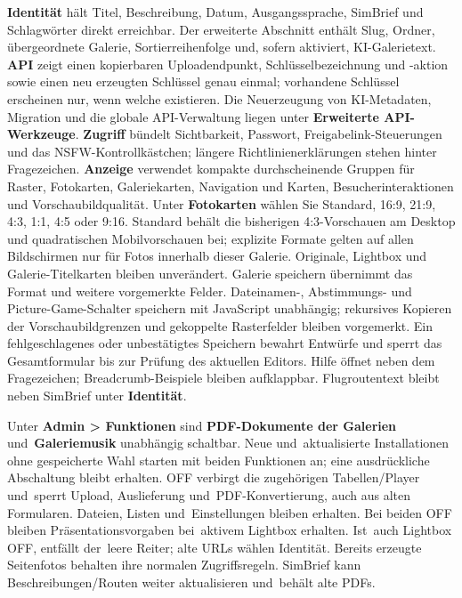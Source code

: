 \documentclass[11pt,a4paper]{article}
\newcommand{\ui}[1]{\textbf{#1}}
\begin{document}
\ui{Identität} hält Titel, Beschreibung, Datum, Ausgangssprache, SimBrief und
Schlagwörter direkt erreichbar. Der erweiterte Abschnitt enthält Slug, Ordner,
übergeordnete Galerie, Sortierreihenfolge und, sofern aktiviert, KI-Galerietext.
\ui{API} zeigt einen kopierbaren Uploadendpunkt, Schlüsselbezeichnung und
-aktion sowie einen neu erzeugten Schlüssel genau einmal; vorhandene Schlüssel
erscheinen nur, wenn welche existieren. Die Neuerzeugung von KI-Metadaten,
Migration und die globale API-Verwaltung liegen unter \ui{Erweiterte
API-Werkzeuge}. \ui{Zugriff} bündelt Sichtbarkeit, Passwort,
Freigabelink-Steuerungen und das NSFW-Kontrollkästchen; längere
Richtlinienerklärungen stehen hinter Fragezeichen. \ui{Anzeige} verwendet
kompakte durchscheinende Gruppen für Raster,
Fotokarten, Galeriekarten, Navigation und Karten, Besucherinteraktionen und
Vorschaubildqualität. Unter \ui{Fotokarten} wählen Sie Standard, 16:9, 21:9,
4:3, 1:1, 4:5 oder 9:16. Standard behält die bisherigen 4:3-Vorschauen am
Desktop und quadratischen Mobilvorschauen bei; explizite Formate gelten auf
allen Bildschirmen nur für Fotos innerhalb dieser Galerie. Originale,
Lightbox und Galerie-Titelkarten bleiben unverändert. Galerie speichern
übernimmt das Format und weitere vorgemerkte Felder. Dateinamen-, Abstimmungs-
und Picture-Game-Schalter speichern mit JavaScript unabhängig; rekursives
Kopieren der Vorschaubildgrenzen und gekoppelte Rasterfelder bleiben vorgemerkt.
Ein fehlgeschlagenes oder unbestätigtes Speichern bewahrt Entwürfe und sperrt
das Gesamtformular bis zur Prüfung des aktuellen Editors. Hilfe öffnet neben
dem Fragezeichen; Breadcrumb-Beispiele bleiben aufklappbar.
Flugroutentext bleibt neben SimBrief unter \ui{Identität}.

Unter \ui{Admin > Funktionen} sind \ui{PDF-Dokumente der Galerien}
und~\ui{Galeriemusik} unabhängig schaltbar. Neue und~aktualisierte
Installationen ohne gespeicherte Wahl starten mit beiden Funktionen an;
eine ausdrückliche Abschaltung bleibt erhalten. OFF verbirgt die zugehörigen
Tabellen/Player und~sperrt Upload, Auslieferung und~PDF-Konvertierung, auch aus
alten Formularen. Dateien, Listen und~Einstellungen bleiben erhalten.
Bei beiden OFF bleiben Präsentationsvorgaben bei~aktivem Lightbox erhalten.
Ist~auch Lightbox OFF, entfällt der~leere Reiter; alte URLs wählen Identität.
Bereits erzeugte Seitenfotos behalten ihre normalen Zugriffsregeln.
SimBrief kann Beschreibungen/Routen weiter aktualisieren und~behält alte PDFs.
\end{document}
